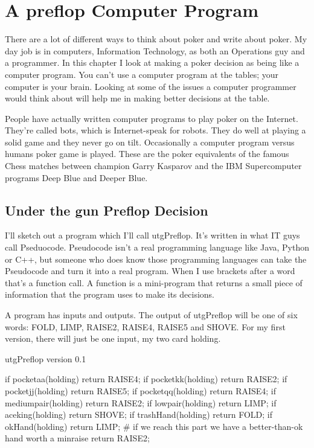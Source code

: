 \chapter{A preflop Computer Program}


There are a lot of different ways to think about poker and write
about poker. My day job is in computers, Information Technology, as
both an Operations guy and a programmer. In this chapter I look at
making a poker decision as being like a computer program. You can't
use a computer program at the tables; your computer is your brain.
Looking at some of the issues a computer programmer would think about
will help me in making better decisions at the table.

People have actually written computer programs to play poker on
the Internet. They're called bots, which is Internet-speak for
robots. They do well at playing a solid game and they never go on tilt.
Occasionally a computer program versus humans poker game is played.
These are the poker equivalents of the famous Chess matches between
champion Garry Kasparov and the IBM Supercomputer programs Deep Blue
and Deeper Blue. 

\section*{Under the gun Preflop Decision}

I'll sketch out a program which I'll call utgPreflop. It's written
in what IT guys call Pseduocode. Pseudocode isn't a real programming
language like Java, Python or C++, but someone who does know those
programming languages can take the Pseudocode and turn it into a real
program. When I use brackets after a word that's a function call.
A function is a mini-program that returns a small piece of information
that the program uses to make its decisions.

A program has inputs and outputs. The output of utgPreflop will
be one of six words: FOLD, LIMP, RAISE2, RAISE4, RAISE5 and SHOVE.
For my first version, there will just be one input, my two card
holding.

utgPreflop version 0.1

if pocketaa(holding) return RAISE4;
if pocketkk(holding) return RAISE2;
if pocketjj(holding) return RAISE5;
if pocketqq(holding) return RAISE4;
if mediumpair(holding) return RAISE2;
if lowpair(holding) return LIMP;
if aceking(holding) return SHOVE;
if trashHand(holding) return FOLD;
if okHand(holding) return LIMP;
\# if we reach this part we have a better-than-ok hand worth a minraise
return RAISE2;

